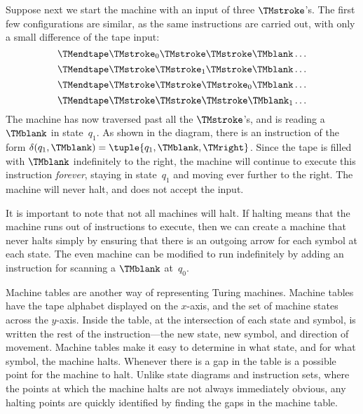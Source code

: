 \documentclass[../../../include/open-logic-section]{subfiles}
\begin{document}
\begin{explain}
Suppose next we start the machine with an input of three
$\TMstroke$'s. The first few configurations are similar, as the same
instructions are carried out, with only a small difference of the tape
input:
\[
\TMendtape \TMstroke_0 \TMstroke \TMstroke \TMblank \ldots
\]
\[
\TMendtape \TMstroke \TMstroke_1 \TMstroke \TMblank \ldots
\]
\[
\TMendtape \TMstroke \TMstroke \TMstroke_0 \TMblank \ldots
\]
\[
\TMendtape \TMstroke \TMstroke \TMstroke \TMblank_1 \ldots
\]
The machine has now traversed past all the $\TMstroke$'s, and is
reading a~$\TMblank$ in state~$q_1$. As shown in the diagram, there is
an instruction of the form $\delta(q_1, \TMblank) =\tuple{q_1,
\TMblank, \TMright}$. Since the tape is filled with $\TMblank$
indefinitely to the right, the machine will continue to execute this
instruction \emph{forever}, staying in state~$q_1$ and moving ever
further to the right. The machine will never halt, and does not accept
the input.
\end{explain}

\begin{explain}
It is important to note that not all machines will halt. If halting
means that the machine runs out of instructions to execute, then we
can create a machine that never halts simply by ensuring that there is
an outgoing arrow for each symbol at each state. The even machine can
be modified to run indefinitely by adding an instruction for scanning a
$\TMblank$ at~$q_0$.
\end{explain}

\begin{ex}
\begin{center}
\end{center}
\end{ex}

\begin{explain}
Machine tables are another way of representing Turing
machines. Machine tables have the tape alphabet displayed on the
$x$-axis, and the set of machine states across the $y$-axis. Inside the
table, at the intersection of each state and symbol, is written the
rest of the instruction---the new state, new symbol, and direction of
movement. Machine tables make it easy to determine in what state, and
for what symbol, the machine halts. Whenever there is a gap in the
table is a possible point for the machine to halt. Unlike state
diagrams and instruction sets, where the points at which the machine
halts are not always immediately obvious, any halting points are
quickly identified by finding the gaps in the machine table.
\end{explain}
\end{document}
